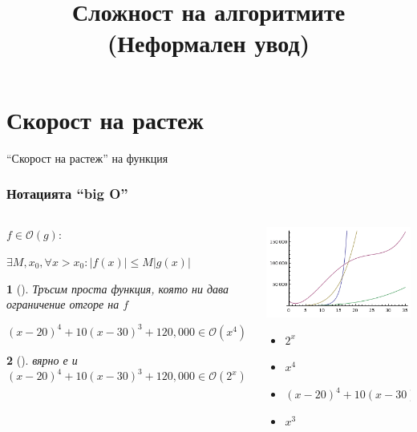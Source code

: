 \documentclass{beamer}
\newtheorem*{remark}{}
\begin{document}
\title[Увод в програмирането]{Сложност на алгоритмите (Неформален увод)} 
\frame{\titlepage} 


\section{Скорост на растеж}


\begin{frame}
\centerline{``Скорост на растеж'' на функция}
\end{frame}



\begin{frame}[fragile]
\frametitle{Нотацията ``big O''}


\begin{columns}[t]
  \begin{column}{0.6\textwidth}


$f \in \mathcal{O}(g):$

\begin{adjustwidth}{0.5cm}{}
$\exists M,x_0,\forall x > x_0:|f(x)| \le M|g(x)| $
\end{adjustwidth}

\vspace{15px}

\begin{remark}[]
    Тръсим проста функция, която ни дава ограничение отгоре на $f$
\end{remark}

\vspace{15px}

$(x-20)^4+10(x-30)^3+120,000 \in \mathcal{O}(x^4)$


\pause
\begin{remark}[]
    вярно е и $(x-20)^4+10(x-30)^3+120,000 \in \mathcal{O}(2^x)$
\end{remark}


  \end{column}
  \begin{column}{0.4\textwidth}
   \vspace*{-65pt}
    \includegraphics[width=5cm]{images/fourgraphs}
    \begin{flushleft}
    \begin{itemize}
      \item $2^x$
      \item $x^4$
      \item $(x-20)^4+10(x-30)^3+120,000$
      \item $x^3$
    \end{itemize}
      
    \end{flushleft}
  \end{column}
\end{columns}



\end{frame}
\end{document}

